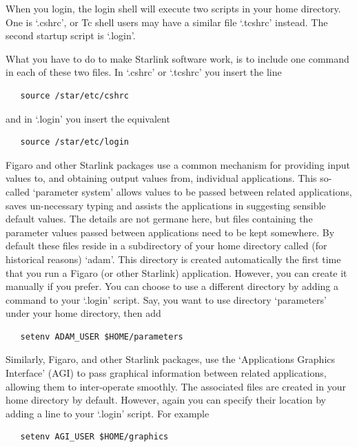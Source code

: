 \documentclass[11pt,twoside]{article}
\begin{document}
   When you login, the login shell will execute two scripts in your home
   directory. One is `.cshrc', or Tc shell users may have a similar file
   `.tcshrc' instead. The second startup script is `.login'.

   What you have to do to make Starlink software work, is to include one
   command in each of these two files. In `.cshrc' or `.tcshrc'
   you insert the line

\begin{verbatim}
   source /star/etc/cshrc
\end{verbatim}

   and in `.login' you insert the equivalent

\begin{verbatim}
   source /star/etc/login
\end{verbatim}

   Figaro and other Starlink packages use a common mechanism for
   providing input values to, and obtaining output values from, individual
   applications.  This so-called `parameter system' allows values to be
   passed between related applications, saves un-necessary typing and
   assists the applications in suggesting sensible default values.  The
   details are not germane here, but files containing the parameter
   values passed between applications need to be kept somewhere.  By
   default these files reside in a subdirectory of your home directory
   called (for historical reasons) `adam'.  This directory is created
   automatically the first time that you run a Figaro (or other Starlink)
   application.  However, you can create it manually if you prefer.  You
   can choose to use a different directory by adding a command to your
   `.login' script.  Say, you want to use directory `parameters' under
   your home directory, then add

\begin{verbatim}
   setenv ADAM_USER $HOME/parameters
\end{verbatim}

   Similarly, Figaro, and other Starlink packages, use the `Applications
   Graphics Interface' (AGI) to pass graphical information between
   related applications, allowing them to inter-operate smoothly.  The
   associated files are created in your home directory by default.
   However, again you can specify their location by adding a line to your
   `.login' script.  For example

\begin{verbatim}
   setenv AGI_USER $HOME/graphics
\end{verbatim}
\end{document}
